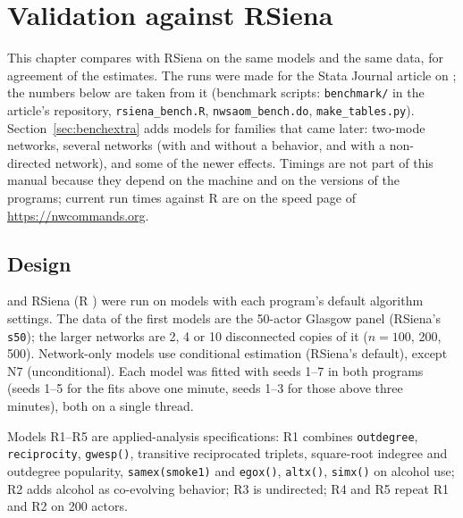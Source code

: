\chapter{Validation against RSiena}
\label{ch:benchmark}


\graphicspath{{bench/}}

This chapter compares \nwsaom{} with RSiena on the same models and the same
data, for agreement of the estimates. The runs were made for the Stata Journal
article on \nwsaom{}; the numbers below are taken from it (benchmark scripts:
\texttt{benchmark/} in the article's repository, \texttt{rsiena\_bench.R},
\texttt{nwsaom\_bench.do}, \texttt{make\_tables.py}). Section~\ref{sec:benchextra}
adds models for families that came later: two-mode networks, several networks
(with and without a behavior, and with a non-directed network), and some of the
newer effects. Timings are not part of this manual because they depend on the
machine and on the versions of the programs; current run times against R are
on the speed page of \url{https://nwcommands.org}.

\section{Design}

\nwsaom{} and RSiena \benchrsiena{} (R \benchrver) were run on \benchnmodels{}
models with each program's default algorithm settings. The data of the first
\benchnmain{} models are the 50-actor Glasgow panel (RSiena's \texttt{s50}); the
larger networks are 2, 4 or 10 disconnected copies of it ($n=100$, 200, 500).
Network-only models use conditional estimation (RSiena's default), except N7
(unconditional). Each model was fitted with seeds 1--7 in both programs (seeds
1--5 for the fits above one minute, seeds 1--3 for those above three minutes),
both on a single thread.

Models R1--R5 are applied-analysis specifications: R1 combines \texttt{outdegree},
\texttt{reciprocity}, \texttt{gwesp()}, transitive reciprocated triplets,
square-root indegree and outdegree popularity, \texttt{samex(smoke1)} and
\texttt{egox()}, \texttt{altx()}, \texttt{simx()} on alcohol use; R2 adds alcohol
as co-evolving behavior; R3 is undirected; R4 and R5 repeat R1 and R2 on 200
actors.


